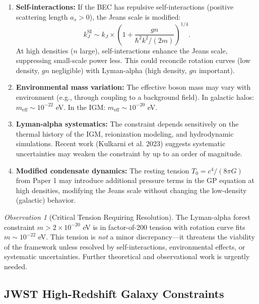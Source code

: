 \documentclass[11pt,a4paper]{article}
\newcommand{\Tzero}{\ensuremath{T_0}}
\theoremstyle{definition}
\theoremstyle{remark}
\newtheorem{observation}{Observation}[section]
\begin{document}
\begin{enumerate}[leftmargin=*, itemsep=0.5em]
\item \textbf{Self-interactions:} If the BEC has repulsive self-interactions (positive scattering length $a_s > 0$), the Jeans scale is modified:
\begin{equation}
k_J^{\mathrm{SI}} \sim k_J \times \left(1 + \frac{g n}{\hbar^2 k^2/(2m)}\right)^{1/4}.
\end{equation}
At high densities ($n$ large), self-interactions enhance the Jeans scale, suppressing small-scale power less. This could reconcile rotation curves (low density, $g n$ negligible) with Lyman-alpha (high density, $g n$ important).

\item \textbf{Environmental mass variation:} The effective boson mass may vary with environment (e.g., through coupling to a background field). In galactic halos: $m_{\mathrm{eff}} \sim 10^{-22}$ eV. In the IGM: $m_{\mathrm{eff}} \sim 10^{-20}$ eV.

\item \textbf{Lyman-alpha systematics:} The constraint depends sensitively on the thermal history of the IGM, reionization modeling, and hydrodynamic simulations. Recent work (Kulkarni et al. 2023) suggests systematic uncertainties may weaken the constraint by up to an order of magnitude.

\item \textbf{Modified condensate dynamics:} The resting tension $\Tzero = c^4/(8\pi G)$ from Paper 1 \cite{Paper1} may introduce additional pressure terms in the GP equation at high densities, modifying the Jeans scale without changing the low-density (galactic) behavior.
\end{enumerate}

\begin{observation}[Critical Tension Requiring Resolution]
The Lyman-alpha forest constraint $m > 2 \times 10^{-20}$ eV is in factor-of-200 tension with rotation curve fits $m \sim 10^{-22}$ eV. This tension is \emph{not} a minor discrepancy---it threatens the viability of the framework unless resolved by self-interactions, environmental effects, or systematic uncertainties. Further theoretical and observational work is urgently needed.
\end{observation}

\subsection{JWST High-Redshift Galaxy Constraints}
\label{sec:JWST}
\end{document}
